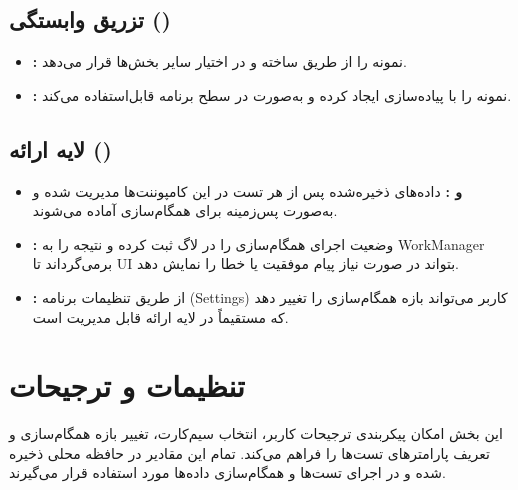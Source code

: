 \subsection{تزریق وابستگی ()}
\begin{itemize}
    \item \textbf{:}  
    نمونه  را از طریق  ساخته و در اختیار سایر بخش‌ها قرار می‌دهد.
    
    \item \textbf{:}  
    نمونه  را با پیاده‌سازی  ایجاد کرده و به‌صورت  در سطح برنامه قابل‌استفاده می‌کند.
\end{itemize}

\subsection{لایه ارائه ()}
\begin{itemize}
    \item \textbf{ و :}  
    داده‌های ذخیره‌شده پس از هر تست در این کامپوننت‌ها مدیریت شده و به‌صورت پس‌زمینه برای همگام‌سازی آماده می‌شوند.
    
    \item \textbf{:}  
    وضعیت اجرای همگام‌سازی را در لاگ ثبت کرده و نتیجه را به WorkManager برمی‌گرداند تا UI بتواند در صورت نیاز پیام موفقیت یا خطا را نمایش دهد.
    
    \item \textbf{:}  
    از طریق تنظیمات برنامه (Settings) کاربر می‌تواند بازه همگام‌سازی را تغییر دهد که مستقیماً در لایه ارائه قابل مدیریت است.
\end{itemize}




\section{تنظیمات و ترجیحات}
این بخش امکان پیکربندی ترجیحات کاربر، انتخاب سیم‌کارت، تغییر بازه همگام‌سازی و تعریف پارامترهای تست‌ها را فراهم می‌کند. تمام این مقادیر در حافظه محلی ذخیره شده و در اجرای تست‌ها و همگام‌سازی داده‌ها مورد استفاده قرار می‌گیرند.

